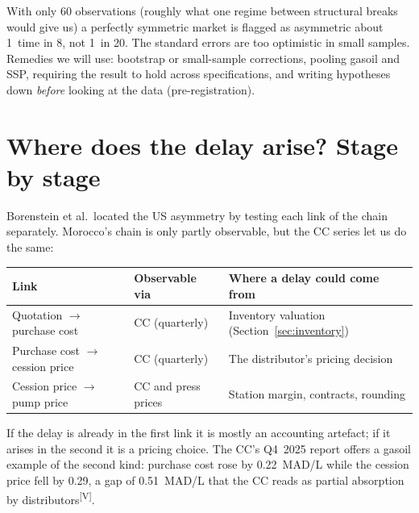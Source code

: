 \documentclass[11pt,a4paper]{article}
\newcommand{\tagV}{\textsuperscript{\textcolor{green!50!black}{\textsf{\scriptsize[V]}}}}
\theoremstyle{definition}
\begin{document}
\begin{table}[h]
\centering

\caption{Monte Carlo size and power of the HAC test of $H_0:B^{+}_1=B^{-}_1$ (nominal level 5\%, 1000 repetitions).}
\end{table}

\begin{warning}
With only 60 observations (roughly what one regime between structural breaks would give us) a perfectly symmetric market is flagged as asymmetric about
1~time in 8, not 1~in 20. The standard errors are too optimistic in small samples. Remedies we will use: bootstrap or small-sample corrections, pooling gasoil and SSP, requiring
the result to hold across specifications, and writing hypotheses down \emph{before} looking at the data (pre-registration).
\end{warning}

\section{Where does the delay arise? Stage by stage}\label{sec:stages}

Borenstein et al.\ located the US asymmetry by testing each link of the chain separately\cite{bcg97}. Morocco's chain is only partly observable, but the CC series let us do the same:

\begin{center}
\small
\begin{tabular}{p{4.0cm}p{3.7cm}p{5.0cm}}
\toprule
Link & Observable via & Where a delay could come from \\
\midrule
Quotation $\to$ purchase cost & CC (quarterly) & Inventory valuation (Section~\ref{sec:inventory}) \\
Purchase cost $\to$ cession price & CC (quarterly) & The distributor's pricing decision \\
Cession price $\to$ pump price & CC and press prices & Station margin, contracts, rounding \\
\bottomrule
\end{tabular}
\end{center}

If the delay is already in the first link it is mostly an accounting artefact; if it arises in the second it is a pricing choice. The CC's Q4~2025 report offers a gasoil example of the second kind: purchase cost rose by 0.22~MAD/L while the cession price fell by 0.29,
a gap of 0.51~MAD/L that the CC reads as partial absorption by distributors\tagV.
\end{document}
